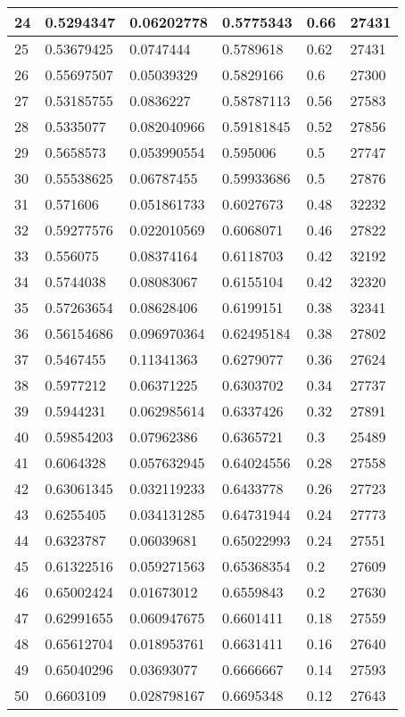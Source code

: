 \begin{longtable}{|l|l|l|l|l|l|}
24 & 0.5294347 & 0.06202778 & 0.5775343 & 0.66 & 27431 \\ \hline 
25 & 0.53679425 & 0.0747444 & 0.5789618 & 0.62 & 27431 \\ \hline 
26 & 0.55697507 & 0.05039329 & 0.5829166 & 0.6 & 27300 \\ \hline 
27 & 0.53185755 & 0.0836227 & 0.58787113 & 0.56 & 27583 \\ \hline 
28 & 0.5335077 & 0.082040966 & 0.59181845 & 0.52 & 27856 \\ \hline 
29 & 0.5658573 & 0.053990554 & 0.595006 & 0.5 & 27747 \\ \hline 
30 & 0.55538625 & 0.06787455 & 0.59933686 & 0.5 & 27876 \\ \hline 
31 & 0.571606 & 0.051861733 & 0.6027673 & 0.48 & 32232 \\ \hline 
32 & 0.59277576 & 0.022010569 & 0.6068071 & 0.46 & 27822 \\ \hline 
33 & 0.556075 & 0.08374164 & 0.6118703 & 0.42 & 32192 \\ \hline 
34 & 0.5744038 & 0.08083067 & 0.6155104 & 0.42 & 32320 \\ \hline 
35 & 0.57263654 & 0.08628406 & 0.6199151 & 0.38 & 32341 \\ \hline 
36 & 0.56154686 & 0.096970364 & 0.62495184 & 0.38 & 27802 \\ \hline 
37 & 0.5467455 & 0.11341363 & 0.6279077 & 0.36 & 27624 \\ \hline 
38 & 0.5977212 & 0.06371225 & 0.6303702 & 0.34 & 27737 \\ \hline 
39 & 0.5944231 & 0.062985614 & 0.6337426 & 0.32 & 27891 \\ \hline 
40 & 0.59854203 & 0.07962386 & 0.6365721 & 0.3 & 25489 \\ \hline 
41 & 0.6064328 & 0.057632945 & 0.64024556 & 0.28 & 27558 \\ \hline 
42 & 0.63061345 & 0.032119233 & 0.6433778 & 0.26 & 27723 \\ \hline 
43 & 0.6255405 & 0.034131285 & 0.64731944 & 0.24 & 27773 \\ \hline 
44 & 0.6323787 & 0.06039681 & 0.65022993 & 0.24 & 27551 \\ \hline 
45 & 0.61322516 & 0.059271563 & 0.65368354 & 0.2 & 27609 \\ \hline 
46 & 0.65002424 & 0.01673012 & 0.6559843 & 0.2 & 27630 \\ \hline 
47 & 0.62991655 & 0.060947675 & 0.6601411 & 0.18 & 27559 \\ \hline 
48 & 0.65612704 & 0.018953761 & 0.6631411 & 0.16 & 27640 \\ \hline 
49 & 0.65040296 & 0.03693077 & 0.6666667 & 0.14 & 27593 \\ \hline 
50 & 0.6603109 & 0.028798167 & 0.6695348 & 0.12 & 27643 \\ \hline 
\end{longtable}